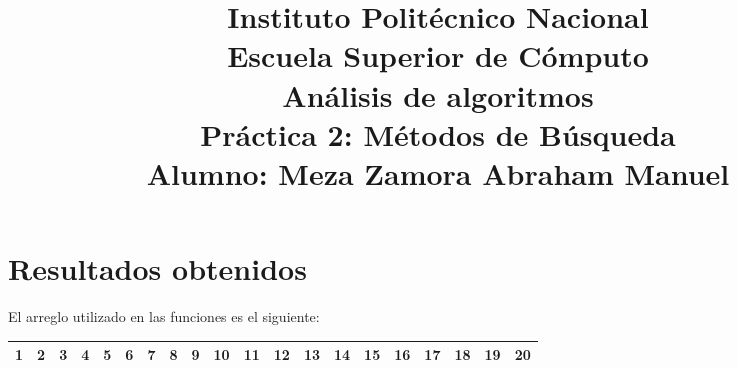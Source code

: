 \documentclass[a4paper,12pt]{article}
\begin{document}
\title{\Large Instituto Politécnico Nacional\\Escuela Superior de Cómputo\\Análisis de algoritmos\\Práctica 2: Métodos de Búsqueda\\Alumno: Meza Zamora Abraham Manuel}
\date{}
\maketitle

\section{Resultados obtenidos }
El arreglo utilizado en las funciones es el siguiente:\\
\begin{table}[h]
\centering
\begin{tabular}{ | c | c | c | c | c | c | c | c | c | c |  c | c | c | c | c | c | c | c | c | c | }
\hline
1 & 2 & 3 & 4 & 5 & 6 & 7 & 8 & 9 & 10 & 11 & 12 & 13 & 14 & 15 & 16 & 17 & 18 & 19 &  20\\
\hline
\end{tabular}
\end{table}
\end{document}

